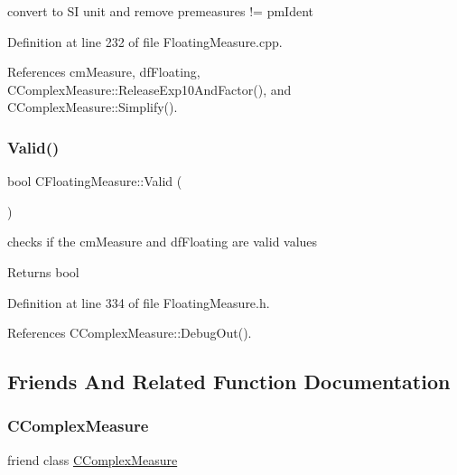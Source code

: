 convert to SI unit and remove premeasures != pm\+Ident 



Definition at line 232 of file Floating\+Measure.\+cpp.



References cm\+Measure, df\+Floating, C\+Complex\+Measure\+::\+Release\+Exp10\+And\+Factor(), and C\+Complex\+Measure\+::\+Simplify().

\mbox{\label{classCFloatingMeasure_a0ff3ae036cd2ee44d6b2eadc609b1d1a}} 
\subsubsection{\texorpdfstring{Valid()}{Valid()}}
{\footnotesize\ttfamily bool C\+Floating\+Measure\+::\+Valid (\begin{DoxyParamCaption}{ }\end{DoxyParamCaption})\hspace{0.3cm}{\ttfamily [inline]}}



checks if the cm\+Measure and df\+Floating are valid values 

\begin{DoxyReturn}{Returns}
bool 
\end{DoxyReturn}


Definition at line 334 of file Floating\+Measure.\+h.



References C\+Complex\+Measure\+::\+Debug\+Out().



\subsection{Friends And Related Function Documentation}
\mbox{\label{classCFloatingMeasure_a2af9f0d4f7a8de5099b8d23df211b616}} 
\subsubsection{\texorpdfstring{C\+Complex\+Measure}{CComplexMeasure}}
{\footnotesize\ttfamily friend class \hyperlink{classCComplexMeasure}{C\+Complex\+Measure}\hspace{0.3cm}{\ttfamily [friend]}}



